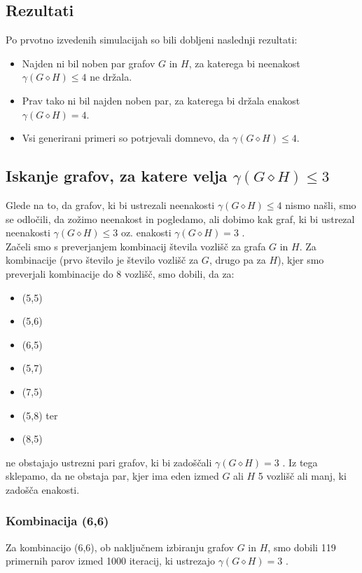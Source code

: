 \documentclass[a4paper,12pt]{article}
\theoremstyle{definition}
\begin{document}
\subsection{Rezultati}
Po prvotno izvedenih simulacijah so bili dobljeni naslednji rezultati:
\begin{itemize}
    \item Najden ni bil noben par grafov $G$ in $H$, za katerega bi neenakost $\gamma(G \diamond H) \leq 4$ ne držala.
    \item Prav tako ni bil najden noben par, za katerega bi držala enakost $\gamma(G \diamond H) = 4$.
    \item Vsi generirani primeri so potrjevali domnevo, da $\gamma(G \diamond H) \leq 4$.
\end{itemize}


\subsection{Iskanje grafov, za katere velja $\gamma(G \diamond H) \leq 3$}
Glede na to, da grafov, ki bi ustrezali neenakosti $\gamma(G \diamond H) \leq 4$ nismo našli, smo se odločili, da zožimo neenakost in pogledamo, ali dobimo kak graf, ki bi ustrezal neenakosti $\gamma(G \diamond H) \leq 3$ oz. enakosti $\gamma(G \diamond H) = 3$ .\\

\noindent Začeli smo s preverjanjem kombinacij števila vozlišč za grafa $G$ in $H$. Za kombinacije (prvo število je število vozlišč za $G$, drugo pa za $H$), kjer smo preverjali kombinacije do 8 vozlišč, smo dobili, da za:
\begin{itemize}
    \item (5,5)
    \item (5,6)
    \item (6,5)
    \item (5,7)
    \item (7,5)
    \item (5,8) ter
    \item (8,5)
\end{itemize}
ne obstajajo ustrezni pari grafov, ki bi zadoščali $\gamma(G \diamond H) = 3$ . Iz tega sklepamo, da ne obstaja par, kjer ima eden izmed $G$ ali $H$ 5 vozlišč ali manj, ki zadošča enakosti.\\

\subsubsection{Kombinacija (6,6)}
\noindent Za kombinacijo (6,6), ob naključnem izbiranju grafov $G$ in $H$, smo dobili 119 primernih parov izmed 1000 iteracij, ki ustrezajo $\gamma(G \diamond H) = 3$ .
\end{document}
